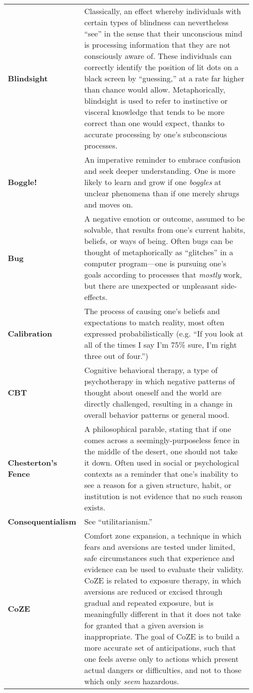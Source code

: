 \begin{longtable} { p{} p{} }
\textbf{Blindsight} & Classically, an effect whereby individuals with certain types of blindness can nevertheless ``see'' in the sense that their unconscious mind is processing information that they are not consciously aware of.  These individuals can correctly identify the position of lit dots on a black screen by ``guessing,'' at a rate far higher than chance would allow.  Metaphorically, blindsight is used to refer to instinctive or visceral knowledge that tends to be more correct than one would expect, thanks to accurate processing by one's subconscious processes.\\

\textbf{Boggle!} & An imperative reminder to embrace confusion and seek deeper understanding.  One is more likely to learn and grow if one \emph{boggles} at unclear phenomena than if one merely shrugs and moves on.\\

\textbf{Bug} & A negative emotion or outcome, assumed to be solvable, that results from one's current habits, beliefs, or ways of being.  Often bugs can be thought of metaphorically as ``glitches'' in a computer program---one is pursuing one's goals according to processes that \emph{mostly} work, but there are unexpected or unpleasant side-effects.\\

\textbf{Calibration} & The process of causing one's beliefs and expectations to match reality, most often expressed probabilistically (e.g. ``If you look at all of the times I say I'm 75\% sure, I'm right three out of four.'')\\

\textbf{CBT} & Cognitive behavioral therapy, a type of psychotherapy in which negative patterns of thought about oneself and the world are directly challenged, resulting in a change in overall behavior patterns or general mood.\\

\textbf{Chesterton's Fence} & A philosophical parable, stating that if one comes across a seemingly-purposeless fence in the middle of the desert, one should not take it down.  Often used in social or psychological contexts as a reminder that one's inability to see a reason for a given structure, habit, or institution is not evidence that no such reason exists.\\

\textbf{Consequentialism} & See ``utilitarianism.''\\

\textbf{CoZE} & Comfort zone expansion, a technique in which fears and aversions are tested under limited, safe circumstances such that experience and evidence can be used to evaluate their validity.  CoZE is related to exposure therapy, in which aversions are reduced or excised through gradual and repeated exposure, but is meaningfully different in that it does not take for granted that a given aversion is inappropriate.  The goal of CoZE is to build a more accurate set of anticipations, such that one feels averse only to actions which present actual dangers or difficulties, and not to those which only \emph{seem} hazardous.\\


\end{longtable}
